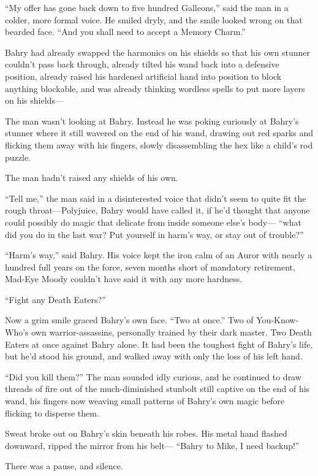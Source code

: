 ``My offer has gone back down to five hundred Galleons,'' said the man
in a colder, more formal voice. He smiled dryly, and the smile looked
wrong on that bearded face. ``And you shall need to accept a Memory
Charm.''

Bahry had already swapped the harmonics on his shields so that his own
stunner couldn't pass back through, already tilted his wand back into a
defensive position, already raised his hardened artificial hand into
position to block anything blockable, and was already thinking wordless
spells to put more layers on his shields---

The man wasn't looking at Bahry. Instead he was poking curiously at
Bahry's stunner where it still wavered on the end of his wand, drawing
out red sparks and flicking them away with his fingers, slowly
disassembling the hex like a child's rod puzzle.

The man hadn't raised any shields of his own.

``Tell me,'' the man said in a disinterested voice that didn't seem to
quite fit the rough throat---Polyjuice, Bahry would have called it, if
he'd thought that anyone could possibly do magic that delicate from
inside someone else's body--- ``what did you do in the last war? Put
yourself in harm's way, or stay out of trouble?''

``Harm's way,'' said Bahry. His voice kept the iron calm of an Auror
with nearly a hundred full years on the force, seven months short of
mandatory retirement, Mad-Eye Moody couldn't have said it with any more
hardness.

``Fight any Death Eaters?''

Now a grim smile graced Bahry's own face. ``Two at once.'' Two of
You-Know-Who's own warrior-assassins, personally trained by their dark
master. Two Death Eaters at once against Bahry alone. It had been the
toughest fight of Bahry's life, but he'd stood his ground, and walked
away with only the loss of his left hand.

``Did you kill them?'' The man sounded idly curious, and he continued to
draw threads of fire out of the much-diminished stunbolt still captive
on the end of his wand, his fingers now weaving small patterns of
Bahry's own magic before flicking to disperse them.

Sweat broke out on Bahry's skin beneath his robes. His metal hand
flashed downward, ripped the mirror from his belt--- ``Bahry to Mike, I
need backup!''

There was a pause, and silence.

